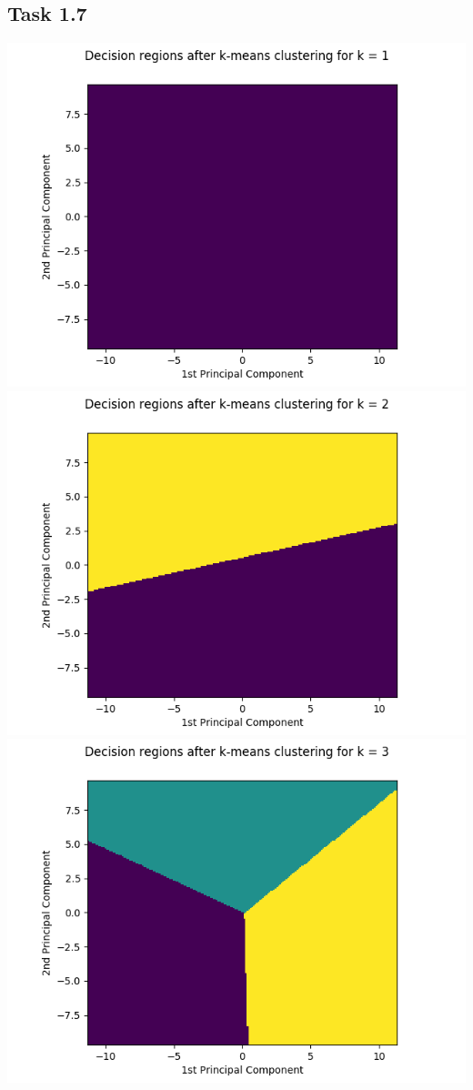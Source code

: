 \documentclass{article}
\begin{document}
\newpage
\subsection*{Task 1.7}

\begin{center}
    \includegraphics[trim=3cm 0 0 0, scale=0.5]{images/task1_7_1.png}
    \includegraphics[trim=3cm 0 3cm 0, scale=0.5]{images/task1_7_2.png}
    \vspace{0.5cm}
    \includegraphics[trim=3cm 0 0 0, scale=0.5]{images/task1_7_3.png}

\end{center}
\end{document}
